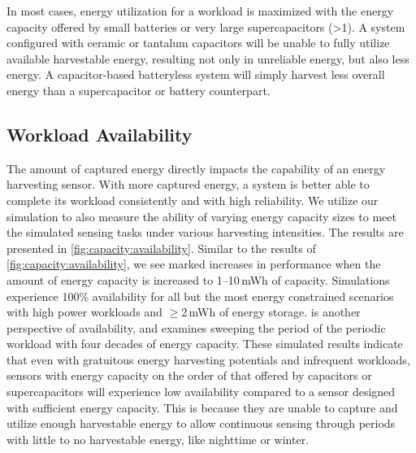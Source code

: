In most cases, energy utilization for a workload is maximized with the energy capacity offered by small batteries or very large supercapacitors (\textgreater 1\ssi{\farad}).
A system configured with ceramic or tantalum capacitors will be unable to fully utilize available harvestable energy, resulting not only in unreliable energy, but also less energy. 
A capacitor-based batteryless system will simply harvest less overall energy than a supercapacitor or battery counterpart. 


\subsection{Workload Availability}
\label{sec:capacity:availability}

The amount of captured energy directly impacts the capability of an energy harvesting sensor. With more captured energy, a system is better able to complete its workload consistently and with high reliability. 
We utilize our simulation to also measure the ability of varying energy capacity sizes to meet the simulated 
sensing tasks under various harvesting intensities. 
The results are
presented in \cref{fig:capacity:availability}. 
Similar to the results of \cref{fig:capacity:availability}, we see marked
increases in performance when the amount of energy capacity is increased to 1--10\,mWh
of capacity.
Simulations experience 100\% availability for all but
the most energy constrained scenarios with high power workloads and
$\geq$2\,mWh of energy storage.
 is another perspective of availability, and examines sweeping the period of the periodic workload with four decades of energy capacity.
These simulated results indicate that even 
with gratuitous energy harvesting potentials and infrequent workloads, sensors with energy capacity on the order of that offered by capacitors or supercapacitors will experience low availability compared to a sensor designed with sufficient energy capacity.
This is because they are
unable to capture and utilize enough harvestable energy to allow continuous sensing through periods with little to no harvestable energy, like nighttime or winter. 

